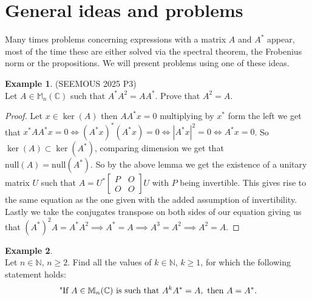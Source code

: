 \documentclass[12pt]{article}
\newcommand{\Null}{\mathrm{null}}
\theoremstyle{definition}
\newtheorem*{example}{Example}
\theoremstyle{remark}
\theoremstyle{plain}
\begin{document}
\section{General ideas and problems}
Many times problems concerning expressions with a matrix $A$ and $A^*$ appear, most of the time these are either solved via the spectral theorem, the Frobenius norm or the propositions. We will present problems using one of these ideas.\\
\begin{example}\textup{(SEEMOUS 2025 P3)}\\ 
	Let $A\in \mathbb{M}_n(\mathbb{C})$ such that $A^*A^2=AA^*$. Prove that $A^2=A$.
    \begin{proof}
	Let $x\in \ker(A)$ then $AA^*x=0$ multiplying by $x^*$ form the left we get that $x^*AA^*x=0 \iff (A^*x)^*(A^*x)=0 \iff |A^*x|^2=0\iff A^*x=0$. So $\ker(A) \subset \ker(A^*)$, comparing dimension we get that $\Null(A)= \Null(A^*)$. So by the above lemma we get the existence of a unitary matrix $U$ such that $A=U^*\begin{bmatrix}
		P & O\\
		O & O
\end{bmatrix}U
$ with $P$ being invertible. This gives rise to the same equation as the one given with the added assumption of invertibility. Lastly we take the conjugates transpose on both sides of our equation giving us that $(A^*)^2A=A^*A^2\implies A^*=A \implies A^3=A^2 \implies A^2=A$.
\end{proof}
\end{example}
\begin{example}\leavevmode \\
    Let $n\in \mathbb{N}$, $n\geq 2$. Find all the values of $k\in \mathbb{N}$, $k\geq1$, for which the following statement holds: $$\textup{"If }A\in \mathbb{M}_n(\mathbb{C})\text{ is such that } A^kA^*=A, \text{ then } A=A^*. $$
\end{example}
\end{document}
